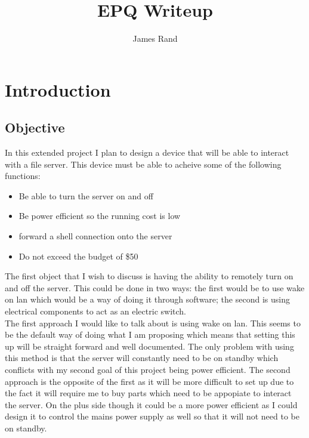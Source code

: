 \documentclass{article}
\title{EPQ Writeup}
\date{}
\author{James Rand}
\begin{document}
\maketitle

\tableofcontents
\setcounter{tocdepth}{5}

\newpage

\section{Introduction}
\subsection{Objective}

In this extended project I plan to design a device that will be able to interact with a file
server. This device must be able to acheive some of the following functions:

\begin{itemize}
    \item Be able to turn the server on and off
    \item Be power efficient so the running cost is low
    \item forward a shell connection onto the server
    \item Do not exceed the budget of \$50
\end{itemize}

The first object that I wish to discuss is having the ability to remotely turn on and off the
server. This could be done in two ways: the first would be to use wake on lan which would be 
a way of doing it through software; the second is using electrical components to act as an
electric switch. \\

The first approach I would like to talk about is using wake on lan. This seems to be the default
way of doing what I am proposing which means that setting this up will be straight forward and
well documented. The only problem with using this method is that the server will constantly need
to be on standby which conflicts with my second goal of this project being power efficient. The
second approach is the opposite of the first as it will be more difficult to set up due to the 
fact it will require me to buy parts which need to be appopiate to interact the server. On the
plus side though it could be a more power efficient as I could design it to control the mains
power supply as well so that it will not need to be on standby.
\end{document}
